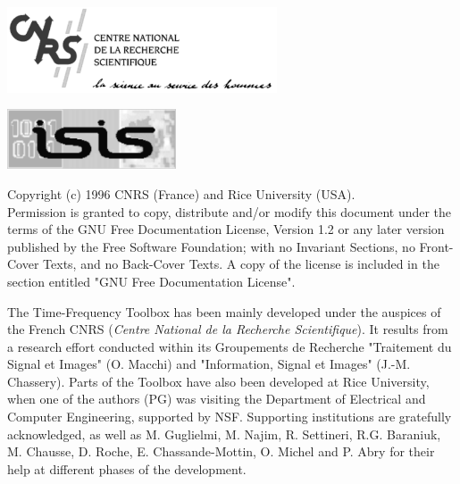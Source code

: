 \documentclass[11pt,a4paper,twoside]{book} %
\begin{document}
\pagestyle{empty}

\cleardoublepage

\vspace{4 cm}
\centerline{\includegraphics[width=8cm]{figure/cnrs}}


\vspace{3 cm}
\centerline{\includegraphics[width=5cm]{figure/isis}}

\vspace{2 cm}
Copyright (c)  1996 CNRS (France) and Rice University (USA).\\
Permission is granted to copy, distribute and/or modify this document
under the terms of the GNU Free Documentation License, Version 1.2
or any later version published by the Free Software Foundation;
with no Invariant Sections, no Front-Cover Texts, and no Back-Cover
Texts.  A copy of the license is included in the section entitled "GNU
Free Documentation License".

\vspace{2 cm}
The Time-Frequency Toolbox has been mainly developed under the auspices of
the French CNRS ({\em Centre National de la Recherche Scientifique}). It
results from a research effort conducted within its Groupements de
Recherche "Traitement du Signal et Images" (O. Macchi) and "Information,
Signal et Images" (J.-M. Chassery). Parts of the Toolbox have also been
developed at Rice University, when one of the authors (PG) was visiting the
Department of Electrical and Computer Engineering, supported by NSF.
Supporting institutions are gratefully acknowledged, as well as M.
Guglielmi, M. Najim, R. Settineri, R.G. Baraniuk, M. Chausse, D. Roche,
E. Chassande-Mottin, O. Michel and P. Abry for their help at different 
phases of the development.
\end{document}
